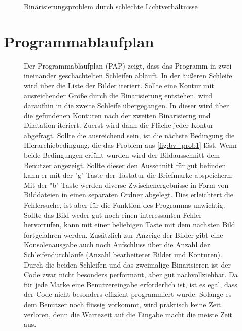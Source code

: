 \documentclass[12pt,toc=bib,toc=listof]{scrreprt}
\begin{document}
\begin{figure}[h]
\begin{minipage}[t]{.2\linewidth}
  \caption{Binärisierungsproblem durch schlechte Lichtverhältnisse}
  \label{fig:bv_prob3}
\end{minipage}
\end{figure}

\section{Programmablaufplan}
\label{sec_bv:pap}
\begin{figure}[h]
\begin{minipage}[t]{.62\linewidth}
Der Programmablaufplan (PAP) zeigt, dass das Programm in zwei ineinander geschachtelten Schleifen abläuft. In der äußeren Schleife wird über die Liste der Bilder iteriert. Sollte eine Kontur mit ausreichender Größe durch die Binarisierung entstehen, wird daraufhin in die zweite Schleife übergegangen. In dieser wird über die gefundenen Konturen nach der zweiten Binarisierng und Dilatation iteriert. Zuerst wird dann die Fläche jeder Kontur abgefragt. Sollte die ausreichend sein, ist die nächste Bedingung die Hierarchiebedingung, die das Problem aus \ref{fig:bv_prob1} löst. Wenn beide Bedingungen erfüllt wurden wird der Bildausschnitt dem Benutzer angezeigt. Sollte dieser den Ausschnitt für gut befinden kann er mit der "g" Taste der Tastatur die Briefmarke abspeichern. Mit der "b" Taste werden diverse Zwischenergebnisse in Form von Bilddateien in einen separaten Ordner abgelegt. Dies erleichtert die Fehlersuche, ist aber für die Funktion des Programms unwichtig. Sollte das Bild weder gut noch einen interessanten Fehler hervorrufen, kann mit einer beliebigen Taste mit dem nächsten Bild fortgefahren werden. Zusätzlich zur Anzeige der Bilder gibt eine Konsolenausgabe auch noch Aufschluss über die Anzahl der Schleifendurchläufe (Anzahl bearbeiteter Bilder und Konturen). Durch die beiden Schleifen und das zweimalige Binarisieren ist der Code zwar nicht besonders performant, aber gut nachvollziehbar. Da für jede Marke eine Benutzereingabe erforderlich ist, ist es egal, dass der Code nicht besonders effizient programmiert wurde. Solange es dem Benutzer noch flüssig vorkommt, wird praktisch keine Zeit verloren, denn die Wartezeit auf die Eingabe macht die meiste Zeit aus.
\end{minipage}
\hfill
\begin{minipage}[t]{.33\linewidth}
\strut\vspace*{-\baselineskip}
\newline

\end{minipage}
\end{figure}
\end{document}
